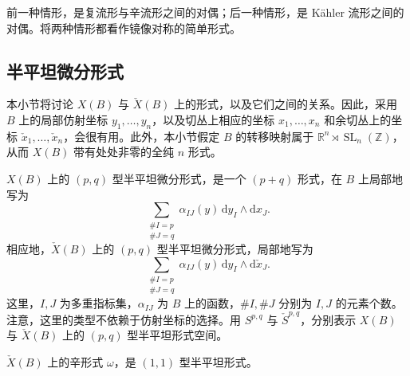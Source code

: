 前一种情形，是复流形与辛流形之间的对偶；后一种情形，是 Kähler 流形之间的对偶。将两种情形都看作镜像对称的简单形式。

\subsection{半平坦微分形式}\label{sec:6.2.2}

本小节将讨论 $X(B)$ 与 $\check X(B)$ 上的形式，以及它们之间的关系。因此，采用 $B$ 上的局部仿射坐标 $y_1,\ldots,y_n$，以及切丛上相应的坐标 $x_1,\ldots,x_n$ 和余切丛上的坐标 $\check x_1,\ldots,\check x_n$，会很有用。此外，本小节假定 $B$ 的转移映射属于 $\mathbb R^n\rtimes\operatorname{SL}_n(\mathbb Z)$，从而 $X(B)$ 带有处处非零的全纯 $n$ 形式。

\begin{definition}\label{def:6.18}
$X(B)$ 上的 $(p,q)$ 型半平坦微分形式，是一个 $(p+q)$ 形式，在 $B$ 上局部地写为
\[
\sum_{\substack{\#I=p\\\#J=q}}\alpha_{IJ}(y)\,\mathrm dy_I\wedge\mathrm dx_J.
\]
相应地，$\check X(B)$ 上的 $(p,q)$ 型半平坦微分形式，局部地写为
\[
\sum_{\substack{\#I=p\\\#J=q}}\alpha_{IJ}(y)\,\mathrm dy_I\wedge\mathrm d\check x_J.
\]
这里，$I,J$ 为多重指标集，$\alpha_{IJ}$ 为 $B$ 上的函数，$\#I,\#J$ 分别为 $I,J$ 的元素个数。注意，这里的类型不依赖于仿射坐标的选择。用 $S^{p,q}$ 与 $\check S^{p,q}$，分别表示 $X(B)$ 与 $\check X(B)$ 上的 $(p,q)$ 型半平坦形式空间。
\end{definition}

\begin{example*}
$\check X(B)$ 上的辛形式 $\omega$，是 $(1,1)$ 型半平坦形式。
\end{example*}

